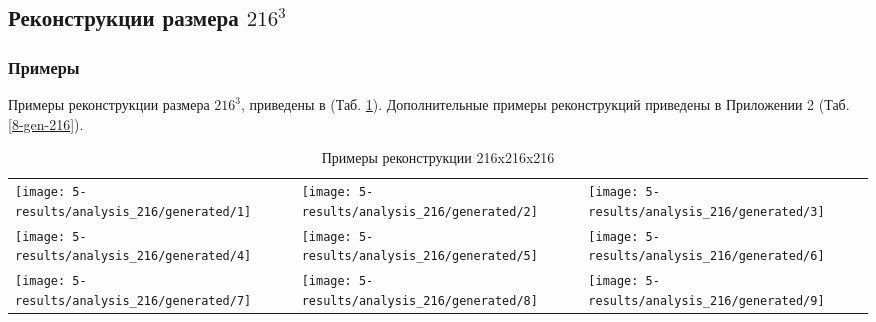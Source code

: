 	
	\subsection{Реконструкции размера $216^3$}
		\subsubsection{Примеры}
			Примеры реконструкции размера $216^3$, приведены в (Таб. \ref{5-gen-216}). Дополнительные примеры реконструкций приведены в Приложении 2 (Таб. \ref{8-gen-216}).
		
			\begin{table}[h]
				\centering
				\begin{tabular}{p{5cm} p{5cm} p{5cm}}
					\toprule
					\texttt{[image: 5-results/analysis\_216/generated/1]}
					&
					\texttt{[image: 5-results/analysis\_216/generated/2]}
					&
					\texttt{[image: 5-results/analysis\_216/generated/3]}
					\\
					\texttt{[image: 5-results/analysis\_216/generated/4]}
					&
					\texttt{[image: 5-results/analysis\_216/generated/5]}
					&
					\texttt{[image: 5-results/analysis\_216/generated/6]}
					\\
					\texttt{[image: 5-results/analysis\_216/generated/7]}
					&
					\texttt{[image: 5-results/analysis\_216/generated/8]}
					&
					\texttt{[image: 5-results/analysis\_216/generated/9]}
					\\
					\bottomrule
				\end{tabular}
				\caption{Примеры реконструкции 216x216x216}
				\label{5-gen-216}
			\end{table} 
		
